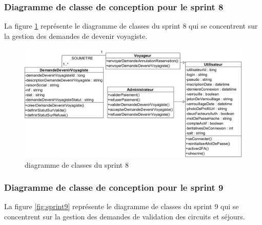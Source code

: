 \documentclass[12pt]{report}
\begin{document}
			\subsubsection{Diagramme de classe de conception pour le sprint 8}
				
			\hspace{15pt} La figure \ref{fig:sprint8} représente le diagramme de classes du sprint 8 qui se concentrent sur la gestion des demandes de devenir voyagiste.


			\begin{figure}[h]
				\centering
				\includegraphics[width=\textwidth]{sprint8.jpg}
				\caption{diagramme de classes du sprint 8}
				\label{fig:sprint8}
			\end{figure}
			\FloatBarrier


			\subsubsection{Diagramme de classe de conception pour le sprint 9}
				
			\hspace{15pt} La figure \ref{fig:sprint9} représente le diagramme de classes du sprint 9 qui se concentrent sur la gestion des demandes de validation des circuits et séjours.
\end{document}

